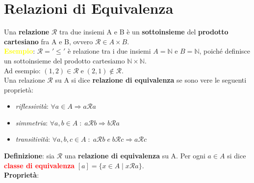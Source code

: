 \section{Relazioni di Equivalenza}
Una \textbf{relazione} $\mathcal{R}$ tra due insiemi A e B è un \textbf{sottoinsieme} del \textbf{prodotto cartesiano} fra A e B, ovvero $\mathcal{R} \in A \times B$. \\
\textcolor{yellow}{\textbf{Esempio}}: $\mathcal{R} = '\leq'$ è relazione tra i due insiemi $A = \mathbb{N}$ e $B = \mathbb{N}$, poiché definisce un sottoinsieme del prodotto cartesiamo $\mathbb{N} \times \mathbb{N}$. \\
Ad esempio: $(1, 2) \in \mathcal{R} \; \text{e} \; (2, 1) \notin \mathcal{R}$. \\ \newline
Una relazione $\mathcal{R}$ su A si dice \textbf{relazione di equivalenza} se sono vere le seguenti proprietà:
\begin{itemize}
    \item \textit{riflessività}: $\forall a \in A \Rightarrow a\mathcal{R}a$
    \item \textit{simmetria}: $\forall a,b \in A \; : \; a\mathcal{R}b \Rightarrow b\mathcal{R}a$
    \item \textit{transitività}: $\forall a,b,c \in A \; : \; a\mathcal{R}b \; e \; b\mathcal{R}c \Rightarrow a\mathcal{R}c$
\end{itemize}
\textbf{Definizione}: sia $\mathcal{R}$ una \textbf{relazione di equivalenza} su A. Per ogni $a \in A$ si dice \textcolor{red}{\textbf{classe di equivalenza}} $[a] = \{x \in A \; | \; x\mathcal{R}a\}$. \\ \newline
\textbf{Proprietà}:

